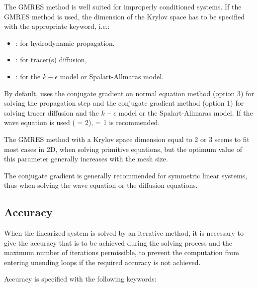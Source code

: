 The GMRES method is well suited for improperly conditioned systems.
If the GMRES method is used, the dimension of the Krylov space has to be
specified with the appropriate keyword, i.e.:

\begin{itemize}
\item {}: for hydrodynamic propagation,

\item {}: for tracer(s) diffusion,

\item {}:
for the $k-\epsilon$ model or Spalart-Allmaras model.
\end{itemize}

By default,  uses the conjugate gradient on normal equation method
(option 3) for solving the propagation step
and the conjugate gradient method (option 1) for solving tracer diffusion and
the $k-\epsilon$ model or the Spalart-Allmaras model.
If the wave equation is used ( = 2),
 = 1 is recommended.

The GMRES method with a Krylov space dimension equal to 2 or 3 seems
to fit most cases in 2D, when solving primitive equations,
but the optimum value of this parameter generally increases with the mesh size.

The conjugate gradient is generally recommended for symmetric linear systems,
thus when solving the wave equation or the diffusion equations.


\subsection{Accuracy}

When the linearized system is solved by an iterative method, it is necessary
to give the accuracy that is to be achieved during the solving process and
the maximum number of iterations permissible, to prevent the computation
from entering unending loops if the required accuracy is not achieved.

Accuracy is specified with the following keywords:

